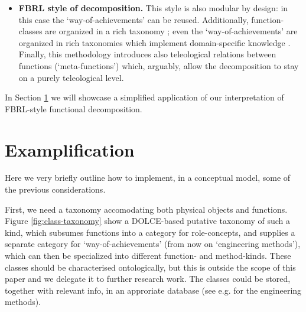 \documentclass[
]{ceurart}
\begin{document}
\begin{itemize}
  \item \textbf{FBRL style of decomposition.} This style is also modular by design: in this case the `way-of-achievements' can be reused. Additionally, function-classes are organized in a rich taxonomy%
  ; even the `way-of-achievements' are organized in rich taxonomies which implement domain-specific knowledge \cite{kitamuraOntologybasedDescriptionFunctional2003}. Finally, this methodology introduces also teleological relations between functions (`meta-functions') which, arguably, allow the decomposition to stay on a purely teleological level. 
\end{itemize}
In Section \ref{sec:use-case} we will showcase a simplified application of our interpretation of FBRL-style functional decomposition.


\section{Examplification}\label{sec:use-case}

Here we very briefly outline how to implement, in a conceptual model, some of the previous considerations.

First, we need a taxonomy accomodating both physical objects and functions. Figure \ref{fig:class-taxonomy} show a DOLCE-based \cite{borgoDOLCEDescriptiveOntology2022} putative taxonomy of such a kind, which subsumes functions into a category for role-concepts, and %
supplies a separate category for `way-of-achievements' (from now on `engineering methods'), which can then be specialized into different function- and method-kinds. These classes should be characterised ontologically, but this is outside the scope of this paper and we delegate it to further research work. The classes could be stored, together with relevant info, in an approriate database (see e.g. \cite{kitamuraOntologybasedDescriptionFunctional2003} for the engineering methods).
\end{document}
